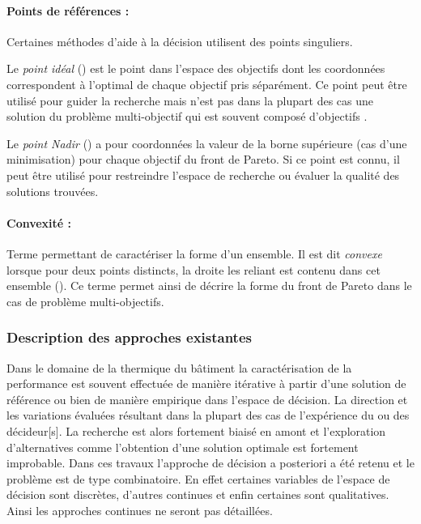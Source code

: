 \paragraph{Points de références : } %
\label{par:points_de_references}
Certaines méthodes d’aide à la décision utilisent des points singuliers.

Le \emph{point idéal} () est le point dans l’espace des objectifs dont
les coordonnées correspondent à l’optimal de chaque objectif pris séparément. Ce point
peut être utilisé pour guider la recherche mais n’est pas dans la plupart des cas
une solution du problème multi-objectif qui est souvent composé d’objectifs
.

Le \emph{point Nadir} () a pour coordonnées la
valeur de la borne supérieure (cas d’une minimisation) pour chaque objectif du front
de Pareto. Si ce point est connu, il peut être utilisé pour restreindre l’espace
de recherche ou évaluer la qualité des solutions trouvées.

\paragraph{Convexité :} %
\label{par:convexite}
Terme permettant de caractériser la forme d’un ensemble.
Il est dit \emph{convexe} lorsque pour deux points distincts, la droite les reliant
est contenu dans cet ensemble (\cite{Collette2002}). Ce terme permet ainsi de décrire
la forme du front de Pareto dans le cas de problème multi-objectifs.

\subsubsection{Description des approches existantes} %
\label{ssub:description_des_approches_existantes}
Dans le domaine de la thermique du bâtiment la caractérisation
de la performance est souvent effectuée de manière itérative à partir d’une solution
de référence ou bien de manière empirique dans l’espace de décision. La direction et
les variations évaluées résultant dans la plupart des cas de l’expérience du ou des
décideur[s]. La recherche est alors fortement biaisé en amont et l’exploration
d’alternatives comme l’obtention d’une solution optimale est fortement improbable.
Dans ces travaux l’approche de décision a posteriori a été retenu et le problème
est de type combinatoire. En effet certaines variables de l’espace de décision
sont discrètes, d’autres continues et enfin certaines sont qualitatives. Ainsi les
approches continues ne seront pas détaillées.

